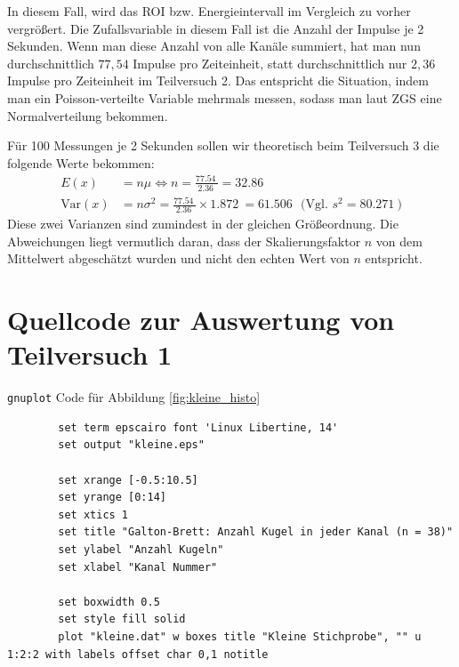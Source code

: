 \documentclass[twoside]{article}
\begin{document}
        In diesem Fall, wird das ROI bzw. Energieintervall im Vergleich zu vorher vergrößert. Die Zufallsvariable in diesem Fall ist die Anzahl der Impulse je 2 Sekunden. Wenn man diese Anzahl von alle Kanäle summiert, hat man nun durchschnittlich $77,54$ Impulse pro Zeiteinheit, statt durchschnittlich nur $2,36$ Impulse pro Zeiteinheit im Teilversuch 2. Das entspricht die Situation, indem man ein Poisson-verteilte Variable mehrmals messen, sodass man laut ZGS eine Normalverteilung bekommen.

        Für 100 Messungen je 2 Sekunden sollen wir theoretisch beim Teilversuch 3 die folgende Werte bekommen:
        \begin{align} 
            E(x) &= n\mu \iff n = \frac{\SI{77.54}{}}{\SI{2.36}{}} = 32.86 \\
            \text{Var}(x) &= n\sigma^2 = \frac{\SI{77.54}{}}{\SI{2.36}{}} \times \SI{1.872}{} = \SI{61.506}{} ~~\text{(Vgl. $s^2 = \SI{80.271}{}$)}
        \end{align}
        Diese zwei Varianzen sind zumindest in der gleichen Größeordnung. Die Abweichungen liegt vermutlich daran, dass der Skalierungsfaktor $n$ von dem Mittelwert abgeschätzt wurden und nicht den echten Wert von $n$ entspricht. 

\appendix
\newpage
\section{Quellcode zur Auswertung von Teilversuch 1}
    \label{appdx:codes}
    
    \texttt{gnuplot} Code für Abbildung \ref{fig:kleine_histo}
    \begin{verbatim}
        set term epscairo font 'Linux Libertine, 14'
        set output "kleine.eps"
        
        set xrange [-0.5:10.5]
        set yrange [0:14]
        set xtics 1
        set title "Galton-Brett: Anzahl Kugel in jeder Kanal (n = 38)"
        set ylabel "Anzahl Kugeln"
        set xlabel "Kanal Nummer"
        
        set boxwidth 0.5
        set style fill solid
        plot "kleine.dat" w boxes title "Kleine Stichprobe", "" u 1:2:2 with labels offset char 0,1 notitle
    \end{verbatim}
    
\end{document}
